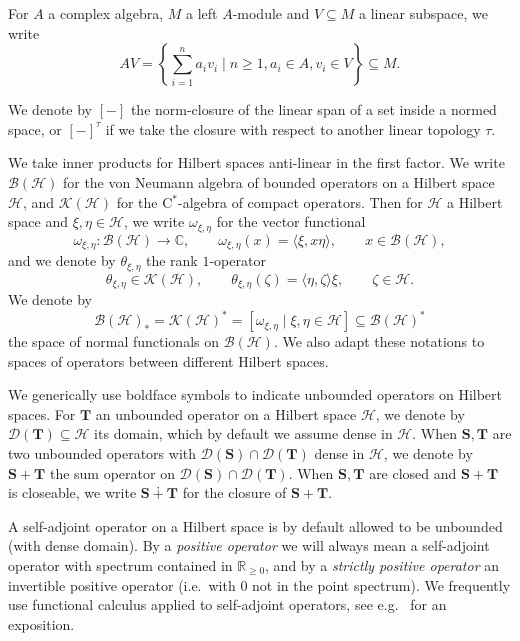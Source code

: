 \documentclass[11pt, reqno]{amsart}
\theoremstyle{definition}
\numberwithin{equation}{section}
\def\C{\mathbb C}
\def\msD{\mathscr D}
\def\Hc{\mathcal H}
\def\R{\mathbb R}
\newcommand{\Hsp}{\mathcal{H}}
\newcommand{\Bc}{\mathcal{B}}
\newcommand{\Kc}{\mathcal{K}}
\newcommand{\Sb}{\mathbf{S}}
\newcommand{\Tb}{\mathbf{T}}
\begin{document}
For $A$ a complex algebra, $M$ a left $A$-module and $V \subseteq M$ a linear subspace, we write 
\[
AV = \left\{\sum_{i=1}^n a_iv_i\mid n \geq 1,a_i \in A,v_i\in V\right\} \subseteq M.
\]

We denote by $[-]$ the norm-closure of the linear span of a set inside a normed space, or $[-]^{\tau}$ if we take the closure with respect to another linear topology $\tau$. 

We take inner products for Hilbert spaces anti-linear in the first factor. We write $\Bc(\Hc)$ for the von Neumann algebra of bounded operators on a Hilbert space $\Hc$, and $\Kc(\Hc)$ for the C$^*$-algebra of compact operators. Then for $\Hc$ a Hilbert space and $\xi,\eta \in \Hc$, we write $\omega_{\xi,\eta}$ for the vector functional 
\begin{equation}\label{EqGenNormFunctVect}
\omega_{\xi,\eta}\colon \Bc(\Hc) \rightarrow \C, \qquad \omega_{\xi,\eta}(x) = \langle \xi,x\eta\rangle,\qquad x\in \Bc(\Hc),
\end{equation} 
and we denote by $\theta_{\xi,\eta}$ the rank $1$-operator
\begin{equation}\label{EqRank1Op}
\theta_{\xi,\eta}\in \Kc(\Hc),\qquad \theta_{\xi,\eta}(\zeta) = \langle \eta,\zeta\rangle \xi,\qquad \zeta\in \Hc.
\end{equation}
We denote by
\[
\Bc(\Hc)_* = \Kc(\Hc)^* = [\omega_{\xi,\eta}\mid \xi,\eta \in \Hc] \subseteq \Bc(\Hsp)^*
\]
the space of normal functionals on $\Bc(\Hc)$. We also adapt these notations to spaces of operators between different Hilbert spaces.

We generically use boldface symbols to indicate unbounded operators on Hilbert spaces. For $\mathbf{T}$ an unbounded operator on a Hilbert space $\Hsp$, we denote by $\msD(\mathbf{T})\subseteq \Hsp$ its domain, which by default we assume dense in $\Hsp$. When $\Sb,\Tb$ are two unbounded operators with $\msD(\Sb)\cap \msD(\Tb)$ dense in $\Hsp$, we denote by $\Sb+\Tb$ the sum operator on $\msD(\Sb)\cap \msD(\Tb)$. When $\Sb,\Tb$ are closed and $\Sb+\Tb$ is closeable, we write $\Sb \dotplus \Tb$ for the closure of $\Sb+ \Tb$. 

A self-adjoint operator on a Hilbert space is by default allowed to be unbounded (with dense domain). By a \emph{positive operator} we will always mean a self-adjoint operator with spectrum contained in $\R_{\geq0}$, and by a \emph{strictly positive operator} an invertible positive operator (i.e.\ with $0$ not in the point spectrum). We frequently use functional calculus applied to self-adjoint operators, see e.g.\  \cite[Chapter 5]{Sch12} for an exposition. 
\end{document}
